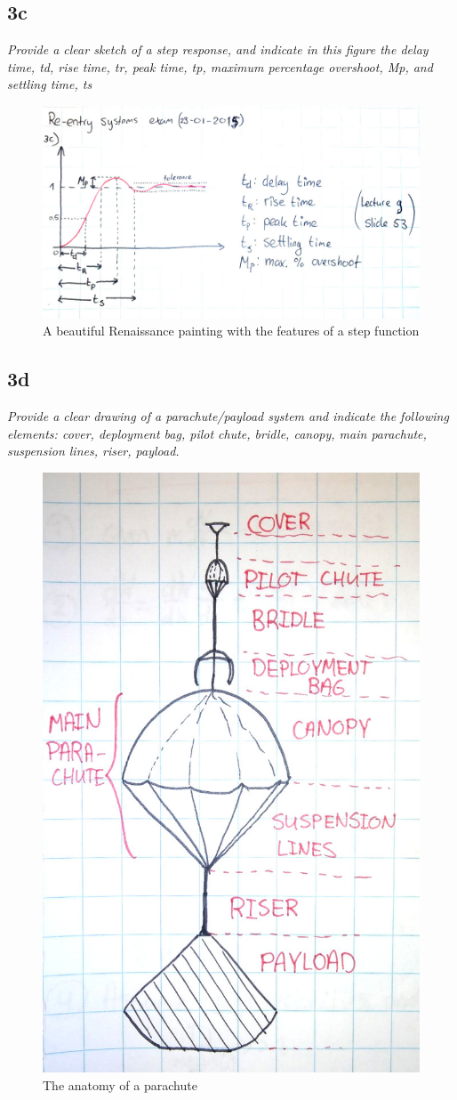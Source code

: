 \subsection{3c}
\textit{Provide a clear sketch of a step response, and indicate in this figure the delay
time, td, rise time, tr, peak time, tp, maximum percentage overshoot, Mp, and settling
time, ts}\\
\begin{figure}[H]
    \centering
    \includegraphics[width=0.9\columnwidth]{Figures/picture_step.jpg}
    \caption{A beautiful Renaissance painting with the features of a step function}
    \label{fig:step}
\end{figure}

\subsection{3d}
\textit{Provide a clear drawing of a parachute/payload system and indicate the
following elements: cover, deployment bag, pilot chute, bridle, canopy, main parachute,
suspension lines, riser, payload.}\\
\begin{figure}[H]
    \centering
    \includegraphics[width=0.4\columnwidth]{Figures/picture_parachutes.jpg}
    \caption{The anatomy of a parachute}
    \label{fig:chute}
\end{figure}